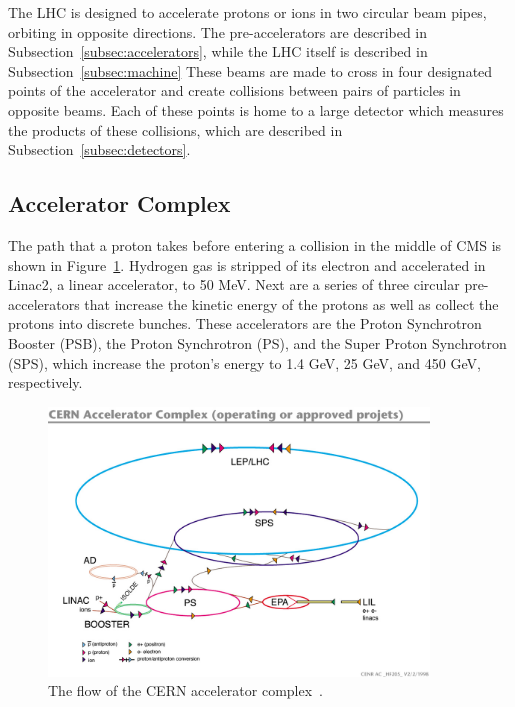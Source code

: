 The LHC is designed to accelerate protons or ions in two circular beam pipes, orbiting in opposite directions. The pre-accelerators are described in Subsection~\ref{subsec:accelerators}, while the LHC
itself is described in Subsection~\ref{subsec:machine}
These beams are made to cross in four designated points of the accelerator and create collisions between
pairs of particles in opposite beams.
Each of these points is home to a large detector which measures the
products of these collisions, which are described in Subsection~\ref{subsec:detectors}.

\subsection{Accelerator Complex\label{subsec:accelerators}}

The path that a proton takes before entering a collision in the middle of CMS is shown in
Figure~\ref{fig:cern_accelerators}. Hydrogen gas is stripped of its electron and accelerated in
Linac2, a linear accelerator, to 50 MeV. Next are a series of three circular pre-accelerators that
increase the kinetic energy of the protons as well as collect the protons into discrete bunches.
These accelerators are the Proton Synchrotron Booster (PSB), the Proton Synchrotron (PS), and the
Super Proton Synchrotron (SPS), which increase the proton's energy to 1.4 GeV, 25 GeV, and 450 GeV,
respectively. 

\begin{figure}[ht]
 \begin{center}
    \includegraphics[width=0.90\textwidth]{figures/experiment/lhc-pho-1991-001.jpg}
      \end{center}
\caption{The flow of the CERN accelerator complex~\cite{Jean-Luc:841493}.}
\label{fig:cern_accelerators}
\end{figure}

